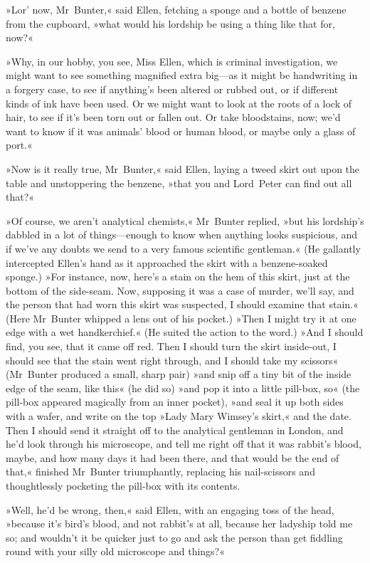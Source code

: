 »Lor' now, Mr~Bunter,« said Ellen, fetching a sponge and a bottle of benzene from the cupboard, »what would his lordship be using a thing like that for, now?«

»Why, in our hobby, you see, Miss Ellen, which is criminal investigation, we might want to see something magnified extra big—as it might be handwriting in a forgery case, to see if anything's been altered or rubbed out, or if different kinds of ink have been used. Or we might want to look at the roots of a lock of hair, to see if it's been torn out or fallen out. Or take bloodstains, now; we'd want to know if it was animals' blood or human blood, or maybe only a glass of port.«

»Now is it really true, Mr~Bunter,« said Ellen, laying a tweed skirt out upon the table and unstoppering the benzene, »that you and Lord~Peter can find out all that?«

»Of course, we aren't analytical chemists,« Mr~Bunter replied, »but his lordship's dabbled in a lot of things—enough to know when anything looks suspicious, and if we've any doubts we send to a very famous scientific gentleman.« (He gallantly intercepted Ellen's hand as it approached the skirt with a benzene-soaked sponge.) »For instance, now, here's a stain on the hem of this skirt, just at the bottom of the side-seam. Now, supposing it was a case of murder, we'll say, and the person that had worn this skirt was suspected, I should examine that stain.« (Here Mr~Bunter whipped a lens out of his pocket.) »Then I might try it at one edge with a wet handkerchief.« (He suited the action to the word.) »And I should find, you see, that it came off red.  Then I should turn the skirt inside-out, I should see that the stain went right through, and I should take my scissors« (Mr~Bunter produced a small, sharp pair) »and snip off a tiny bit of the inside edge of the seam, like this« (he did so) »and pop it into a little pill-box, so« (the pill-box appeared magically from an inner pocket), »and seal it up both sides with a wafer, and write on the top »Lady Mary Wimsey's skirt,« and the date. Then I should send it straight off to the analytical gentleman in London, and he'd look through his microscope, and tell me right off that it was rabbit's blood, maybe, and how many days it had been there, and that would be the end of that,« finished Mr~Bunter triumphantly, replacing his nail-scissors and thoughtlessly pocketing the pill-box with its contents.

»Well, he'd be wrong, then,« said Ellen, with an engaging toss of the head, »because it's bird's blood, and not rabbit's at all, because her ladyship told me so; and wouldn't it be quicker just to go and ask the person than get fiddling round with your silly old microscope and things?«

